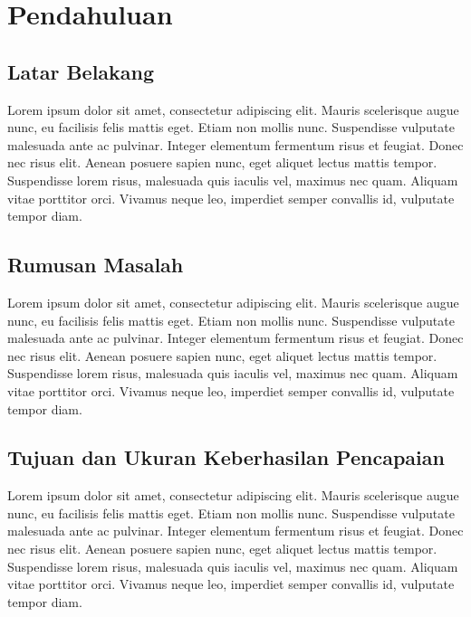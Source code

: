 
\chapter{Pendahuluan}

\section{Latar Belakang}

Lorem ipsum dolor sit amet, consectetur adipiscing elit. Mauris scelerisque augue nunc, eu facilisis felis mattis eget. Etiam non mollis nunc. Suspendisse vulputate malesuada ante ac pulvinar. Integer elementum fermentum risus et feugiat. Donec nec risus elit. Aenean posuere sapien nunc, eget aliquet lectus mattis tempor. Suspendisse lorem risus, malesuada quis iaculis vel, maximus nec quam. Aliquam vitae porttitor orci. Vivamus neque leo, imperdiet semper convallis id, vulputate tempor diam.

\section{Rumusan Masalah}

Lorem ipsum dolor sit amet, consectetur adipiscing elit. Mauris scelerisque augue nunc, eu facilisis felis mattis eget. Etiam non mollis nunc. Suspendisse vulputate malesuada ante ac pulvinar. Integer elementum fermentum risus et feugiat. Donec nec risus elit. Aenean posuere sapien nunc, eget aliquet lectus mattis tempor. Suspendisse lorem risus, malesuada quis iaculis vel, maximus nec quam. Aliquam vitae porttitor orci. Vivamus neque leo, imperdiet semper convallis id, vulputate tempor diam.

\section{Tujuan dan Ukuran Keberhasilan Pencapaian}

Lorem ipsum dolor sit amet, consectetur adipiscing elit. Mauris scelerisque augue nunc, eu facilisis felis mattis eget. Etiam non mollis nunc. Suspendisse vulputate malesuada ante ac pulvinar. Integer elementum fermentum risus et feugiat. Donec nec risus elit. Aenean posuere sapien nunc, eget aliquet lectus mattis tempor. Suspendisse lorem risus, malesuada quis iaculis vel, maximus nec quam. Aliquam vitae porttitor orci. Vivamus neque leo, imperdiet semper convallis id, vulputate tempor diam.

